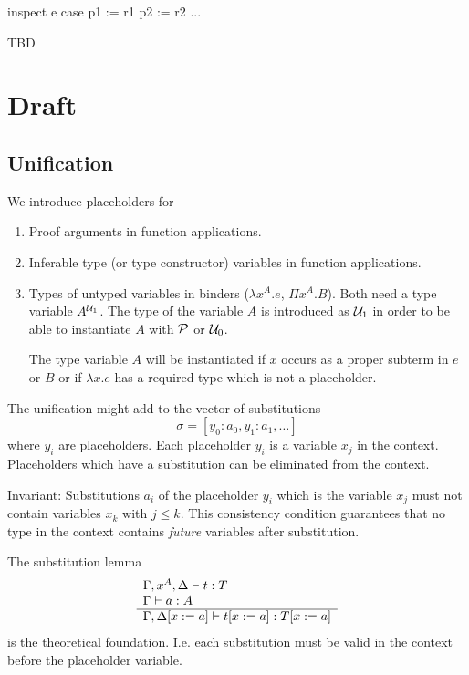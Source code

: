 \begin{alba}
  inspect
    e
  case
    p1 := r1
    p2 := r2
    ...
\end{alba}


\vskip 5mm
TBD
\vskip 5mm




\newpage
\section{Draft}

\subsection{Unification}

We introduce placeholders for

\begin{enumerate}

\item Proof arguments in function applications.

\item Inferable type (or type constructor) variables in function applications.

\item Types of untyped variables in binders ($\lambda x^A . e$, $\Pi x^A
  . B$). Both need a type variable $A^{{\cal{U}}_1}$. The type of the variable $A$
  is introduced as ${\cal{U}}_1$ in order to be able to instantiate $A$ with
  ${\cal{P}}$ or ${\cal{U}}_0$.

  The type variable $A$ will be instantiated if $x$ occurs as a proper subterm
  in $e$ or $B$ or if $\lambda x . e$ has a required type which is not a
  placeholder.

\end{enumerate}


The unification might add to the vector of substitutions
$$
\sigma = [y_0 : a_0, y_1 : a_1, \ldots]
$$
where $y_i$ are placeholders. Each placeholder $y_i$ is a variable $x_j$ in
the context. Placeholders which have a substitution can be eliminated from the
context.

Invariant: Substitutions $a_i$ of the placeholder $y_i$ which is the variable
$x_j$ must not contain variables $x_k$ with $j \le k$. This consistency
condition guarantees that no type in the context contains \emph{future}
variables after substitution.


The substitution lemma
$$
\begin{array}{l} 
  \Gamma,x^A,\Delta \vdash t : T
  \\
  \Gamma \vdash a: A
 \\ \hline \Gamma, \Delta[x:=a] \vdash t[x:=a] : T[x:=a]\end{array}
$$
is the theoretical foundation. I.e. each substitution must be valid in the
context before the placeholder variable.





